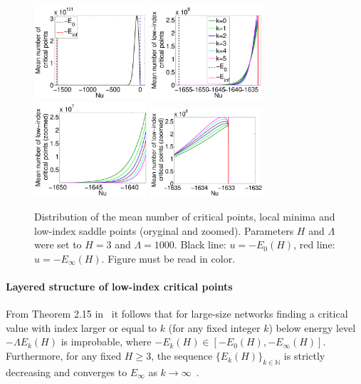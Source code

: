 \documentclass[twoside]{article}
\begin{document}
\begin{figure}[htp!]
  \center
\includegraphics[width = 1.65in]{Distr_cp.pdf}
\includegraphics[width = 1.65in]{Distr_lm_sp_li.pdf} 
\includegraphics[width = 1.65in]{Distr_lm_sp_li_zoomed_left.pdf} 
\includegraphics[width = 1.65in]{Distr_lm_sp_li_zoomed_right.pdf} 
\vspace{-0.3in}
\caption{Distribution of the mean number of critical points, local minima and low-index saddle points (oryginal and zoomed). Parameters $H$ and $\Lambda$ were set to $H = 3$ and $\Lambda = 1000$. Black line: $u = -E_0(H)$, red line: $u = -E_{\infty}(H)$. Figure must be read in color.}
\label{fig:Distr_cp_lm_sp}
\vspace{-0.05in}
\end{figure}

\paragraph{Layered structure of low-index critical points}
From Theorem 2.15 in~\cite{AAC2010} it follows that for large-size networks finding a critical value with index larger or equal to $k$ (for any fixed integer $k$) below energy level $-\Lambda E_k(H)$ is improbable, where $-E_k(H) \in [-E_0(H),-E_{\infty}(H)]$. Furthermore, for any fixed $H \geq 3$, the sequence $\{E_k(H)\}_{k\in\mathbb{N}}$ is strictly decreasing and converges to $E_{\infty}$ as $k \rightarrow \infty$~\cite{AAC2010}. 
\end{document}
